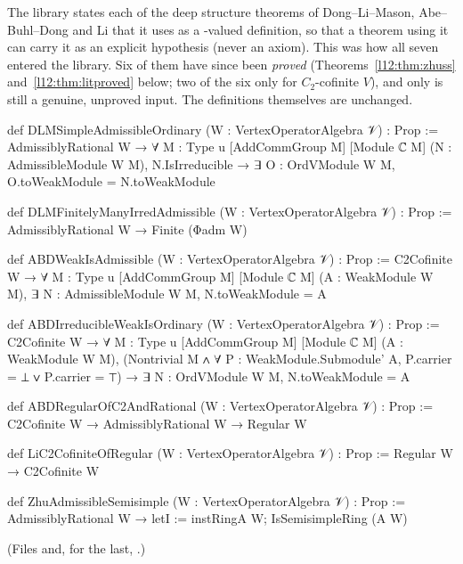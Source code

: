 The library states each of the deep structure theorems of Dong--Li--Mason, Abe--Buhl--Dong and Li that it uses as a
-valued definition, so that a theorem using it can carry it as an explicit hypothesis (never an axiom). This was
how all seven entered the library. Six of them have since been \emph{proved} (Theorems~\ref{l12:thm:zhuss}
and~\ref{l12:thm:litproved} below; two of the six only for $C_2$-cofinite $V$), and only  is
still a genuine, unproved input. The definitions themselves are unchanged.
\begin{leancode}
def DLMSimpleAdmissibleOrdinary (W : VertexOperatorAlgebra 𝒱) : Prop :=
  AdmissiblyRational W →
    ∀ {M : Type u} [AddCommGroup M] [Module ℂ M] (N : AdmissibleModule W M),
      N.IsIrreducible → ∃ O : OrdVModule W M, O.toWeakModule = N.toWeakModule

def DLMFinitelyManyIrredAdmissible (W : VertexOperatorAlgebra 𝒱) : Prop :=
  AdmissiblyRational W → Finite (Φadm W)

def ABDWeakIsAdmissible (W : VertexOperatorAlgebra 𝒱) : Prop :=
  C2Cofinite W → ∀ {M : Type u} [AddCommGroup M] [Module ℂ M] (A : WeakModule W M),
    ∃ N : AdmissibleModule W M, N.toWeakModule = A

def ABDIrreducibleWeakIsOrdinary (W : VertexOperatorAlgebra 𝒱) : Prop :=
  C2Cofinite W → ∀ {M : Type u} [AddCommGroup M] [Module ℂ M] (A : WeakModule W M),
    (Nontrivial M ∧ ∀ P : WeakModule.Submodule' A, P.carrier = ⊥ ∨ P.carrier = ⊤) →
    ∃ N : OrdVModule W M, N.toWeakModule = A

def ABDRegularOfC2AndRational (W : VertexOperatorAlgebra 𝒱) : Prop :=
  C2Cofinite W → AdmissiblyRational W → Regular W

def LiC2CofiniteOfRegular (W : VertexOperatorAlgebra 𝒱) : Prop :=
  Regular W → C2Cofinite W

def ZhuAdmissibleSemisimple (W : VertexOperatorAlgebra 𝒱) : Prop :=
  AdmissiblyRational W → letI := instRingA W; IsSemisimpleRing (A W)
\end{leancode}
(Files  and, for the last,
.)

